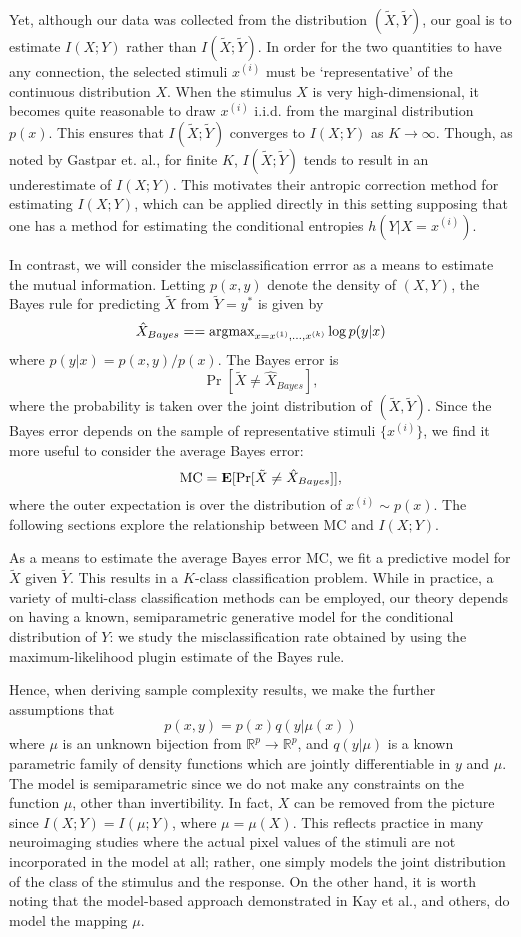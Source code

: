 \documentclass[12pt]{article}
\begin{document}
Yet, although our data was collected from the distribution
$(\tilde{X}, \tilde{Y})$, our goal is to estimate $I(X; Y)$ rather
than $I(\tilde{X}; \tilde{Y})$.  In order for the two quantities to
have any connection, the selected stimuli $x^{(i)}$ must be
`representative' of the continuous distribution $X$.  When the
stimulus $X$ is very high-dimensional, it becomes quite reasonable to
draw $x^{(i)}$ i.i.d. from the marginal distribution $p(x).$ This
ensures that $I(\tilde{X}; \tilde{Y})$ converges to $I(X; Y)$ as
$K \to \infty$.  Though, as noted by Gastpar et. al., for finite $K$,
$I(\tilde{X}; \tilde{Y})$ tends to result in an underestimate of $I(X;
Y)$. This motivates their antropic correction method for estimating
$I(X;Y)$, which can be applied directly in this setting supposing that
one has a method for estimating the conditional entropies $h(Y|X =
x^{(i)})$.

In contrast, we will consider the misclassification errror as a means to
estimate the mutual information.  Letting $p(x,y)$ denote the density of $(X,Y)$,
the Bayes rule for predicting $\tilde{X}$ from $\tilde{Y} = y^*$ is given by
\[
\hat{X}_{Bayes} = = \text{argmax}_{x = x^{(1)}, \hdots, x^{(k)}} \log p(y|x)
\]
where $p(y|x) = p(x,y)/p(x)$.  The Bayes error is
\[
\Pr[\tilde{X} \neq \hat{X}_{Bayes}],
\]
where the probability is taken over the joint distribution of
$(\tilde{X}, \tilde{Y})$.  Since the Bayes error depends on the
sample of representative stimuli $\{x^{(i)}\}$,
we find it more useful to consider the average Bayes error:
\[
\text{MC} = \textbf{E}[\Pr[\tilde{X} \neq \hat{X}_{Bayes}]],
\]
where the outer expectation is over the distribution of $x^{(i)} \sim p(x)$.
The following sections explore the relationship between $\text{MC}$
and $I(X;Y)$.

As a means to estimate the average Bayes error $\text{MC}$, we fit a
predictive model for $\tilde{X}$ given $\tilde{Y}$.  This results in a
$K$-class classification problem.  While in practice, a variety of
multi-class classification methods can be employed, our theory depends
on having a known, semiparametric generative model for the conditional
distribution of $Y$: we study the misclassification rate obtained by
using the maximum-likelihood plugin estimate of the Bayes rule.

Hence, when deriving sample complexity results, we make the further assumptions
that
\[
p(x, y) = p(x) q(y|\mu(x))
\]
where $\mu$ is an unknown bijection from
$\mathbb{R}^p \to \mathbb{R}^p$, and $q(y|\mu)$ is a known parametric family of density
functions which are jointly differentiable in $y$ and $\mu$.  The
model is semiparametric since we do not make any constraints on the
function $\mu$, other than invertibility.  In fact, $X$ can be removed
from the picture since $I(X; Y)= I(\mu; Y)$, where $\mu = \mu(X)$.
This reflects practice in many neuroimaging studies where the actual
pixel values of the stimuli are not incorporated in the model at all;
rather, one simply models the joint distribution of the class of the
stimulus and the response.  On the other hand, it is worth noting
that the model-based approach demonstrated in Kay et al., and others,
do model the mapping $\mu$.
\end{document}
